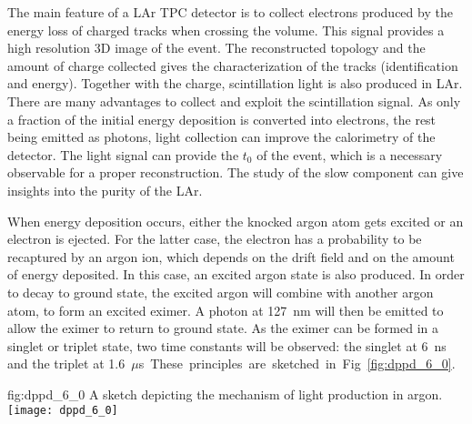 The main feature of a LAr TPC detector is to collect electrons produced by the energy loss of charged tracks when crossing the volume. This signal provides a high resolution 3D image of the event. The reconstructed topology and the amount of charge collected gives the characterization of the tracks (identification and energy). Together with the charge, scintillation light is also produced in LAr. There are many advantages to collect and exploit the scintillation signal. As only a fraction of the initial energy deposition is converted into electrons, the rest being emitted as photons, light collection can improve the calorimetry of the detector. The light signal can provide the $t_0$ of the event, which is a necessary observable for a proper reconstruction. The study of the slow component can give insights into the purity of the LAr. 

When energy deposition occurs, either the knocked argon atom gets excited or an electron is ejected. For the latter case, the electron has a probability to be recaptured by an argon ion, which depends on the drift field and on the amount of energy deposited. In this case, an excited argon state is also produced. In order to decay to ground state, the excited argon will combine with another argon atom, to form an excited eximer. A photon at \SI{127}{nm} will then be emitted to allow the eximer to return to ground state. As the eximer can be formed in a singlet or triplet state, two time constants will be observed: the singlet at \SI{6}{ns}
and the triplet at \SI{1.6}{$\mu$s}. These principles are sketched in Fig.~\ref{fig:dppd_6_0}.

\begin{dunefigure}{fig:dppd_6_0}
{A sketch depicting the mechanism of light production in argon.}
\texttt{[image: dppd\_6\_0]}
\end{dunefigure}

